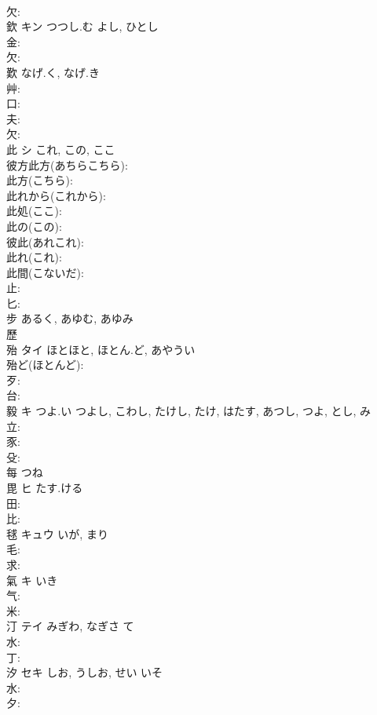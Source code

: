 \documentclass[8pt]{extreport}
\begin{document}
\begin{CJK}{UTF8}{min}
\\	欠: 
\\	欽	キン	つつし.む	よし, ひとし	
\\	金: 
\\	欠: 
\\	歎		なげ.く, なげ.き				
\\	艸: 
\\	口: 
\\	夫: 
\\	欠: 
\\	此	シ	これ, この, ここ		
\\	彼方此方(あちらこちら): 
\\	此方(こちら): 
\\	此れから(これから): 
\\	此処(ここ): 
\\	此の(この): 
\\	彼此(あれこれ): 
\\	此れ(これ): 
\\	此間(こないだ): 
\\	止: 
\\	匕: 
\\	步		あるく, あゆむ, あゆみ				
\\	歷						
\\	殆	タイ	ほとほと, ほとん.ど, あやうい		
\\	殆ど(ほとんど): 
\\	歹: 
\\	台: 
\\	毅	キ	つよ.い	つよし, こわし, たけし, たけ, はたす, あつし, つよ, とし, み	
\\	立: 
\\	豕: 
\\	殳: 
\\	每		つね				
\\	毘	ヒ	たす.ける		
\\	田: 
\\	比: 
\\	毬	キュウ	いが, まり		
\\	毛: 
\\	求: 
\\	氣	キ	いき		
\\	气: 
\\	米: 
\\	汀	テイ	みぎわ, なぎさ	て	
\\	水: 
\\	丁: 
\\	汐	セキ	しお, うしお, せい	いそ	
\\	水: 
\\	夕: 

\end{CJK}
\end{document}
